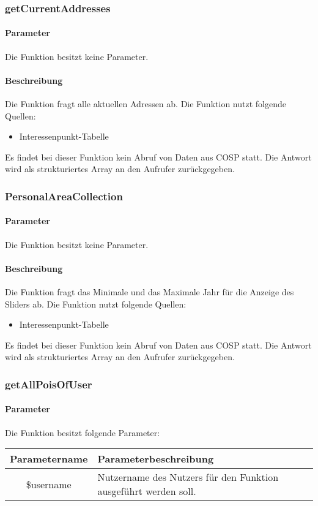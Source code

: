 \subsubsection{getCurrentAddresses}
\paragraph{Parameter} Die Funktion besitzt keine Parameter.
\paragraph{Beschreibung} Die Funktion fragt alle aktuellen Adressen ab. Die Funktion nutzt folgende Quellen:
\begin{itemize}
	\item Interessenpunkt-Tabelle
\end{itemize}
Es findet bei dieser Funktion kein Abruf von Daten aus {\glqq COSP\grqq} statt. Die Antwort wird als strukturiertes Array an den Aufrufer zurückgegeben.
\subsubsection{PersonalAreaCollection}
\paragraph{Parameter} Die Funktion besitzt keine Parameter.
\paragraph{Beschreibung} Die Funktion fragt das Minimale und das Maximale Jahr für die Anzeige des Sliders ab. Die Funktion nutzt folgende Quellen:
\begin{itemize}
	\item Interessenpunkt-Tabelle
\end{itemize}
Es findet bei dieser Funktion kein Abruf von Daten aus {\glqq COSP\grqq} statt. Die Antwort wird als strukturiertes Array an den Aufrufer zurückgegeben.
\subsubsection{getAllPoisOfUser}
\paragraph{Parameter} Die Funktion besitzt folgende Parameter:
\begin{table}[H]
	\begin{tabular}{|c|p{11cm}|}
		\hline
		\textbf{Parametername} & \textbf{Parameterbeschreibung} \\ \hline
		\$username & Nutzername des Nutzers für den Funktion ausgeführt werden soll. \\ \hline
	\end{tabular}
\end{table}

